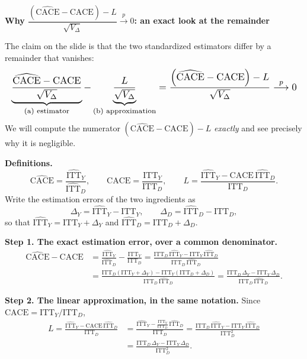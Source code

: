 \documentclass[11pt]{article}
\newcommand{\ITTY}{\mathrm{ITT}_Y}
\newcommand{\ITTD}{\mathrm{ITT}_D}
\newcommand{\CACE}{\mathrm{CACE}}
\newcommand{\hITTY}{\widehat{\mathrm{ITT}}_Y}
\newcommand{\hITTD}{\widehat{\mathrm{ITT}}_D}
\newcommand{\hCACE}{\widehat{\mathrm{CACE}}}
\begin{document}
\begin{center}
{\large\bfseries Why $\dfrac{(\hCACE-\CACE)-L}{\sqrt{V_\Delta}}\overset{p}{\longrightarrow}0$:
an exact look at the remainder}
\end{center}

\bigskip
\noindent
The claim on the slide is that the two standardized estimators differ by a
remainder that vanishes:
\begin{equation*}
\resizebox{\linewidth}{!}{$\displaystyle
\underbrace{\frac{\hCACE - \CACE}{\sqrt{V_\Delta}}}_{\text{(a) estimator}}
- \underbrace{\frac{L}{\sqrt{V_\Delta}}}_{\text{(b) approximation}}
= \frac{\left(\hCACE - \CACE\right) - L}{\sqrt{V_\Delta}}
\overset{p}{\longrightarrow} 0$}
\end{equation*}
We will compute the numerator $\left(\hCACE-\CACE\right)-L$ \emph{exactly} and
see precisely why it is negligible.

\bigskip
\noindent\textbf{Definitions.}
\begin{equation*}
\hCACE = \frac{\hITTY}{\hITTD}, \qquad
\CACE = \frac{\ITTY}{\ITTD}, \qquad
L = \frac{\hITTY - \CACE\,\hITTD}{\ITTD}.
\end{equation*}
Write the estimation errors of the two ingredients as
\begin{equation*}
\Delta_Y = \hITTY - \ITTY, \qquad \Delta_D = \hITTD - \ITTD,
\end{equation*}
so that $\hITTY = \ITTY + \Delta_Y$ and $\hITTD = \ITTD + \Delta_D$.

\bigskip
\noindent\textbf{Step 1. The exact estimation error, over a common denominator.}
\begin{align*}
\hCACE - \CACE
&= \frac{\hITTY}{\hITTD} - \frac{\ITTY}{\ITTD}
= \frac{\ITTD\,\hITTY - \ITTY\,\hITTD}{\ITTD\,\hITTD} \\[4pt]
&= \frac{\ITTD\left(\ITTY+\Delta_Y\right) - \ITTY\left(\ITTD+\Delta_D\right)}{\ITTD\,\hITTD}
= \frac{\ITTD\,\Delta_Y - \ITTY\,\Delta_D}{\ITTD\,\hITTD}.
\end{align*}

\bigskip
\noindent\textbf{Step 2. The linear approximation, in the same notation.}
Since $\CACE = \ITTY/\ITTD$,
\begin{align*}
L = \frac{\hITTY - \CACE\,\hITTD}{\ITTD}
&= \frac{\hITTY - \frac{\ITTY}{\ITTD}\,\hITTD}{\ITTD}
= \frac{\ITTD\,\hITTY - \ITTY\,\hITTD}{\ITTD^{2}} \\[4pt]
&= \frac{\ITTD\,\Delta_Y - \ITTY\,\Delta_D}{\ITTD^{2}}.
\end{align*}
\end{document}

